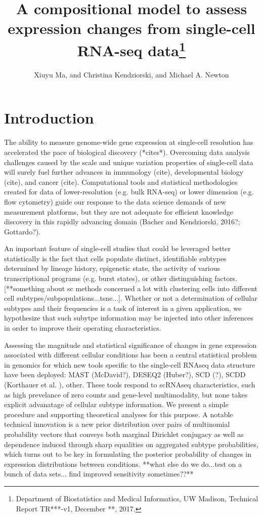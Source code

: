 \documentclass[11pt]{amsart}
\title{A compositional model to assess expression changes from
 single-cell RNA-seq data\footnote{Department of Biostatistics and Medical Informatics, UW Madison, Technical Report TR***-v1, December **, 2017.}}
\author{Xiuyu Ma,  and Christina Kendziorski, and Michael A. Newton}
\begin{document}
\maketitle
\section{Introduction}

The ability to measure genome-wide gene expression at single-cell resolution 
has accelerated the pace of biological discovery (*cites*).  Overcoming data
analysis challenges caused by the scale and unique variation properties of single-cell
data will surely fuel further advances in immunology (cite), developmental
biology (cite), and cancer (cite).  Computational tools and statistical methodologies 
created for data of lower-resolution (e.g. bulk RNA-seq) or lower dimension 
(e.g. flow cytometry)  guide our response to 
 the data science demands of new measurement platforms,
but they are not adequate for efficient knowledge discovery in this
rapidly advancing domain (Bacher and Kendziorski, 2016?; Gottardo?).

An important feature of single-cell studies that could be leveraged better
statistically is the fact that cells populate distinct, identifiable subtypes
determined by lineage history, epigenetic state, the activity
of various transcriptional programs (e.g. burst states), or other 
distinguishing factors. [**something about sc methods concerned a lot with
clustering cells into different cell subtypes/subpopulations...tsne...].
Whether or not a determination of cellular subtypes and their frequencies 
is a task of interest in a given application, we hypothesize that such
subytpe information may be injected into other inferences in order
 to improve their operating characteristics.

Assessing the magnitude and statistical significance of changes in gene
expression associated with different cellular conditions has been a central
statistical problem in genomics for which new tools specific to
the single-cell RNAseq data structure have been deployed: MAST (McDavid?),
DESEQ2 (Huber?), SCD (?), SCDD (Korthauer et al. ), other.  These tools respond
to scRNAseq characteristics, such as high prevelance of zero counts and
gene-level multimodality, but none takes explicit advanatage of cellular subtype
information.  We present a simple procedure and supporting theoretical
analyses for this purpose.  A notable technical innovation is a new prior
distribution over pairs of multinomial probability vectors that conveys
both marginal Dirichlet conjugacy as well as
 dependence induced through sharp equalities on aggregated 
 subtype probabilities, which turns out to be key in formulating 
 the posterior probability of changes in expression distributions between conditions.
 **what else do we do...test on a bunch of data sets...
 find improved sensitivity sometimes??**
\end{document}
